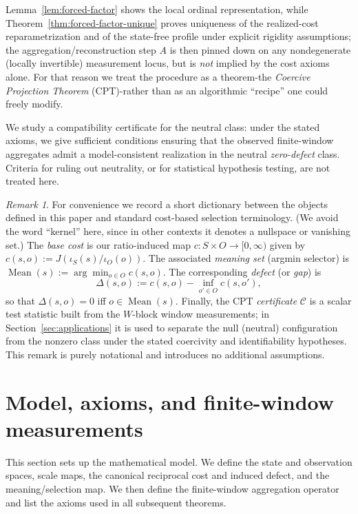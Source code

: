 \documentclass[11pt,reqno]{amsart}
\theoremstyle{definition}
\theoremstyle{remark}
\newtheorem{remark}[theorem]{Remark} %
\newcommand{\1}{\mathbf{1}}
\newcommand{\Mean}{\operatorname{Mean}}
\begin{document}
Lemma~\ref{lem:forced-factor} shows the local ordinal representation, while Theorem~\ref{thm:forced-factor-unique} proves uniqueness of the realized-cost reparametrization and of the state-free profile under explicit rigidity assumptions; the aggregation/reconstruction step $A$ is then pinned down on any nondegenerate (locally invertible) measurement locus, but is \emph{not} implied by the cost axioms alone. For that reason we treat
the procedure as a theorem-the \emph{Coercive Projection Theorem} (CPT)-rather than as an
algorithmic ``recipe'' one could freely modify.

We study a compatibility certificate for the neutral class: under the stated axioms, we give sufficient conditions ensuring that the observed finite-window aggregates admit a model-consistent realization in the neutral \emph{zero-defect} class. Criteria for ruling out neutrality, or for statistical hypothesis testing, are not treated here.

\begin{remark}\label{rem:kernel-dict}
For convenience we record a short dictionary between the objects defined in this paper and standard cost-based selection terminology. (We avoid the word ``kernel'' here, since in other contexts it denotes a nullspace or vanishing set.) The \emph{base cost} is our ratio-induced map $c:S\times O\to[0,\infty)$ given by $c(s,o):=J(\iota_S(s)/\iota_O(o))$. The associated \emph{meaning set} (argmin selector) is $\Mean(s):=\arg\min_{o\in O} c(s,o)$. The corresponding \emph{defect} (or \emph{gap}) is
\[
\Delta(s,o):=c(s,o)-\inf_{o'\in O}c(s,o'),
\]
so that $\Delta(s,o)=0$ iff $o\in\Mean(s)$. Finally, the CPT \emph{certificate} $\mathcal{C}$ is a scalar test statistic built from the $W$-block window measurements; in Section~\ref{sec:applications} it is used to separate the null (neutral) configuration from the nonzero class under the stated coercivity and identifiability hypotheses. This remark is purely notational and introduces no additional assumptions.
\end{remark}

\section{Model, axioms, and finite-window measurements}\label{sec:axioms}

This section sets up the mathematical model. We define the state and observation spaces, scale maps, the canonical reciprocal cost and induced defect, and the meaning/selection map. We then define the finite-window aggregation operator and list the axioms used in all subsequent theorems.
\end{document}
